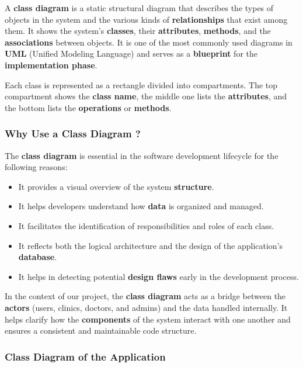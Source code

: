 \documentclass[12pt]{report}
\begin{document}
A \textbf{class diagram} is a static structural diagram that describes the types of objects in the system and the various kinds of \textbf{relationships} that exist among them. It shows the system's \textbf{classes}, their \textbf{attributes}, \textbf{methods}, and the \textbf{associations} between objects. It is one of the most commonly used diagrams in \textbf{UML} (Unified Modeling Language) and serves as a \textbf{blueprint} for the \textbf{implementation phase}.

\noindent Each class is represented as a rectangle divided into compartments. The top compartment shows the \textbf{class name}, the middle one lists the \textbf{attributes}, and the bottom lists the \textbf{operations} or \textbf{methods}.


\subsubsection{Why Use a Class Diagram ?}
\vspace{0.1cm}


The \textbf{class diagram} is essential in the software development lifecycle for the following reasons:

\begin{itemize}
	\item It provides a visual overview of the system \textbf{structure}.
	\item It helps developers understand how \textbf{data} is organized and managed.
	\item It facilitates the identification of responsibilities and roles of each class.
	\item It reflects both the logical architecture and the design of the application's \textbf{database}.
	\item It helps in detecting potential \textbf{design flaws} early in the development process.
\end{itemize}

\noindent In the context of our project, the \textbf{class diagram} acts as a bridge between the \textbf{actors} (users, clinics, doctors, and admins) and the data handled internally. It helps clarify how the \textbf{components} of the system interact with one another and ensures a consistent and maintainable code structure.


\subsubsection{Class Diagram of the Application}
\vspace{0.1cm}
\end{document}
